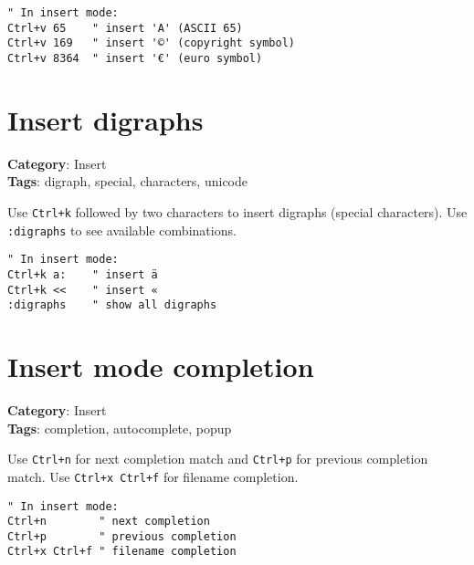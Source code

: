 {{{{{\begin{Exa*}{}
\begin{Verbatim}[fontsize=\footnotesize, breaklines, breakanywhere]
" In insert mode:
Ctrl+v 65    " insert 'A' (ASCII 65)
Ctrl+v 169   " insert '©' (copyright symbol)
Ctrl+v 8364  " insert '€' (euro symbol)
\end{Verbatim}
\end{Exa*}

\section{Insert digraphs}

\textbf{Category}: Insert\\ \textbf{Tags}: digraph, special, characters, unicode
\vspace{0.5cm}

Use {\footnotesize \Verb§Ctrl+k§} followed by two characters to insert digraphs (special characters). Use {\footnotesize \Verb§:digraphs§} to see available combinations.

\begin{Exa*}{}
\begin{Verbatim}[fontsize=\footnotesize, breaklines, breakanywhere]
" In insert mode:
Ctrl+k a:    " insert ä
Ctrl+k <<    " insert «
:digraphs    " show all digraphs
\end{Verbatim}
\end{Exa*}

\section{Insert mode completion}

\textbf{Category}: Insert\\ \textbf{Tags}: completion, autocomplete, popup
\vspace{0.5cm}

Use {\footnotesize \Verb§Ctrl+n§} for next completion match and {\footnotesize \Verb§Ctrl+p§} for previous completion match. Use {\footnotesize \Verb§Ctrl+x Ctrl+f§} for filename completion.

\begin{Exa*}{}
\begin{Verbatim}[fontsize=\footnotesize, breaklines, breakanywhere]
" In insert mode:
Ctrl+n        " next completion
Ctrl+p        " previous completion
Ctrl+x Ctrl+f " filename completion
\end{Verbatim}
\end{Exa*}

}}}}}
